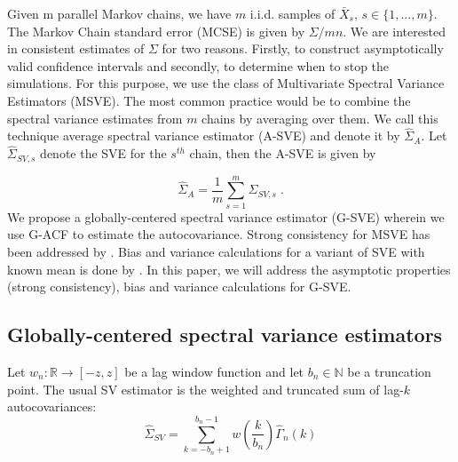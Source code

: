 \documentclass[11pt]{article}
\theoremstyle{remark}
\begin{document}
 Given m parallel Markov chains, we have $m$ i.i.d. samples of $\bar{X}_s$, $s \in \{1,..., m\}$. The Markov Chain standard error (MCSE) is given by $\Sigma/mn$. We are interested in consistent estimates of $\Sigma$ for two reasons. Firstly, to construct asymptotically valid confidence intervals and secondly, to determine when to stop the simulations. For this purpose, we use the class of Multivariate Spectral Variance Estimators (MSVE). The most common practice would be to combine the spectral variance estimates from $m$ chains by averaging over them. We call this technique average spectral variance estimator (A-SVE) and denote it by $\hat{\Sigma}_A$. Let $\hat{\Sigma}_{SV,s}$ denote the SVE for the $s^{th}$ chain, then the A-SVE is given by

\[
\hat{\Sigma}_A = \dfrac{1}{m}\sum_{s=1}^{m}\hat{\Sigma}_{SV,s}\;.
\]
 We propose a globally-centered spectral variance estimator (G-SVE) wherein we use G-ACF to estimate the autocovariance. Strong consistency for MSVE has been addressed by \cite{vats:fleg:jon:2018}. Bias and variance calculations for a variant of SVE with known mean is done by \cite{hannan2009multiple}. In this paper, we will address the asymptotic properties (strong consistency), bias and variance calculations for G-SVE. 

\subsection{Globally-centered spectral variance estimators} %
\label{sub:globally_centered_spectral_variance_estimators}




Let $w_n: \mathbb{R} \to [-z,z]$ be a lag window function and let $b_n \in \mathbb{N}$ be a truncation point. The usual SV estimator is the weighted and truncated sum of lag-$k$ autocovariances:
\begin{equation} \label{eq:sve}
    \hat{\Sigma}_{SV} = \sum_{k=-b_n+1}^{b_n-1}w\left(\dfrac{k}{b_n}\right)\hat{\Gamma}_n(k)
\end{equation}
\end{document}
